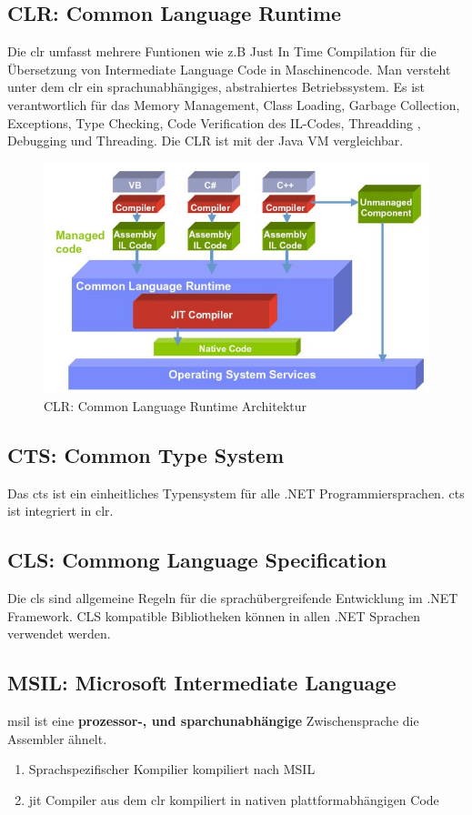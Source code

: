 \documentclass[
a4paper,
oneside,
10pt,
fleqn,
headsepline,
toc=listofnumbered, 
bibliography=totocnumbered]{scrartcl}
\begin{document}
\subsection{CLR: Common Language Runtime}
Die \gls{clr} umfasst mehrere Funtionen wie z.B Just In Time Compilation für die Übersetzung von Intermediate Language Code in Maschinencode. Man versteht unter dem \gls{clr} ein sprachunabhängiges, abstrahiertes Betriebssystem. Es ist verantwortlich für das Memory Management, Class Loading, Garbage Collection, Exceptions, Type Checking, Code Verification des IL-Codes, Threadding
, Debugging und Threading. Die CLR ist mit der Java VM vergleichbar.
\begin{figure}[h]
\centering
\includegraphics[width=0.6\linewidth]{images/common_language_runtime_architektur}
\caption{CLR: Common Language Runtime Architektur}
\label{fig:commonlanguageruntimearchitektur}
\end{figure}

\subsection{CTS: Common Type System}
Das \gls{cts} ist ein einheitliches Typensystem für alle .NET Programmiersprachen. \gls{cts} ist integriert in \gls{clr}. 

\subsection{CLS: Commong Language Specification}
Die \gls{cls} sind allgemeine Regeln für die sprachübergreifende Entwicklung im .NET Framework. CLS kompatible Bibliotheken können in allen .NET Sprachen verwendet werden.

\subsection{MSIL: Microsoft Intermediate Language}
\gls{msil} ist eine \textbf{prozessor-, und sparchunabhängige} Zwischensprache die Assembler ähnelt. 
\begin{enumerate}
	\item Sprachspezifischer Kompilier kompiliert nach MSIL
	\item \gls{jit} Compiler aus dem \gls{clr} kompiliert in nativen plattformabhängigen Code
\end{enumerate}
\end{document}
